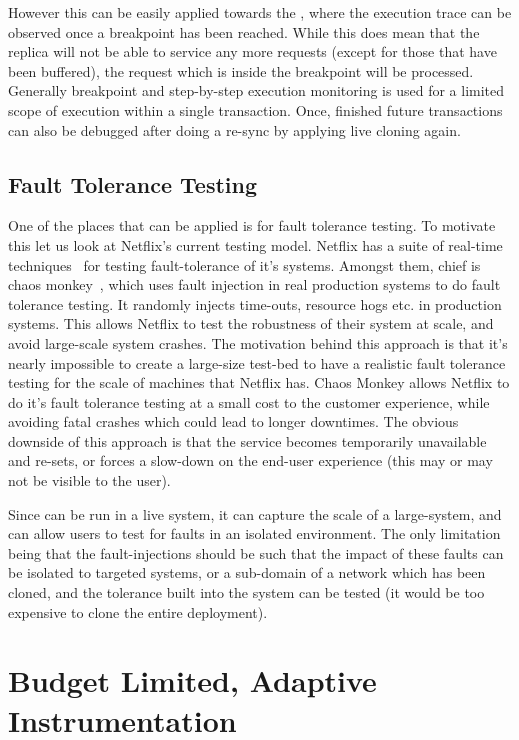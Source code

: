 However this can be easily applied towards the \debugcontainer, where the execution trace can be observed once a breakpoint has been reached.
While this does mean that the replica will not be able to service any more requests (except for those that have been buffered), the request which is inside the breakpoint will be processed.
Generally breakpoint and step-by-step execution monitoring is used for a limited scope of execution within a single transaction.
Once, finished future transactions can also be debugged after doing a re-sync by applying live cloning again.

\subsection{Fault Tolerance Testing}

One of the places that \parikshan can be applied is for fault tolerance testing.
To motivate this let us look at Netflix's current testing model.
Netflix has a suite of real-time techniques~\cite{chaosengineering} for testing fault-tolerance of it's systems.
Amongst them, chief is chaos monkey~\cite{chaosmonkey}, which uses fault injection in real production systems to do fault tolerance testing.
It randomly injects time-outs, resource hogs etc. in production systems. 
This allows Netflix to test the robustness of their system at scale, and avoid large-scale system crashes. 
The motivation behind this approach is that it's nearly impossible to create a large-size test-bed to have a realistic fault tolerance testing for the scale of machines that Netflix has. 
Chaos Monkey allows Netflix to do it's fault tolerance testing at a small cost to the customer experience, while avoiding fatal crashes which could lead to longer downtimes.
The obvious downside of this approach is that the service becomes temporarily unavailable and re-sets, or forces a slow-down on the end-user experience (this may or may not be visible to the user). 

Since \parikshan can be run in a live system, it can capture the scale of a large-system, and can allow users to test for faults in an isolated environment.
The only limitation being that the fault-injections should be such that the impact of these faults can be isolated to targeted systems, or a sub-domain of a network which has been cloned, and the tolerance built into the system can be tested (it would be too expensive to clone the entire deployment).


\section{Budget Limited, Adaptive Instrumentation}
\label{sec:activeBudgetLimited}

